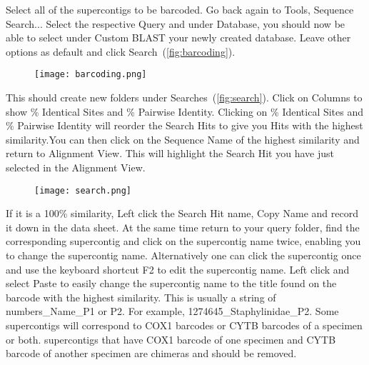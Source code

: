 \documentclass[11pt]{article}
\begin{document}
Select all of the supercontigs to be barcoded. Go back again to Tools, Sequence Search... Select the respective Query and under Database, you should now be able to select under Custom BLAST your newly created database. Leave other options as default and click Search~(\autoref{fig:barcoding}).

\begin{figure}[H]
  \centering
    \texttt{[image: barcoding.png]}
  \label{fig:barcoding}
\end{figure}
 
This should create new folders under Searches~(\autoref{fig:search}). Click on Columns to show \% Identical Sites and \% Pairwise Identity. Clicking on \% Identical Sites and \% Pairwise Identity will reorder the Search Hits to give you Hits with the highest similarity.You can then click on the Sequence Name of the highest similarity and return to Alignment View. This will highlight the Search Hit you have just selected in the Alignment View. 

\begin{figure}[H]
  \centering
    \texttt{[image: search.png]}
  \label{fig:search}
\end{figure}

If it is a 100\% similarity, Left click the Search Hit name, Copy Name and record it down in the data sheet. At the same time return to your query folder, find the corresponding supercontig and click on the supercontig name twice, enabling you to change the supercontig name. Alternatively one can click the supercontig once and use the keyboard shortcut F2 to edit the supercontig name. Left click and select Paste to easily change the supercontig name to the title found on the barcode with the highest similarity. This is usually a string of numbers\_Name\_P1 or P2. For example, 1274645\_Staphylinidae\_P2. Some supercontigs will correspond to COX1 barcodes or CYTB barcodes of a specimen or both. supercontigs that have COX1 barcode of one specimen and CYTB barcode of another specimen are chimeras and should be removed. 
\end{document}
